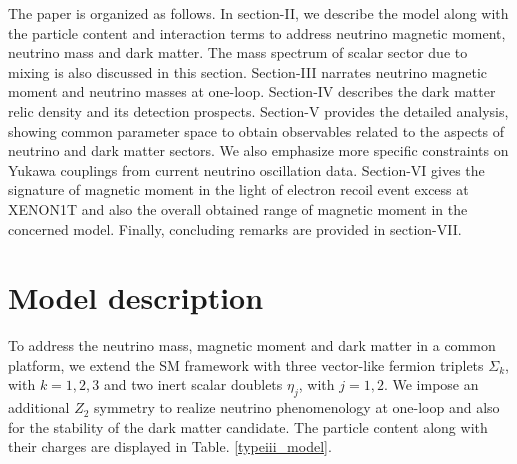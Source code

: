 \documentclass[aps, a4paper,superscriptaddress,12pt,preprintnumbers,floatfix,nofootinbib,amsmath,amssymb]{revtex4}
\begin{document}
The paper is organized as follows. In section-II, we describe the model along with the particle content and interaction terms to address neutrino magnetic moment, neutrino mass and dark matter. The mass spectrum of scalar sector due to mixing is also discussed in this section. Section-III  narrates neutrino magnetic moment and neutrino masses at one-loop. Section-IV describes the   dark matter relic density and its detection prospects. Section-V provides the detailed analysis, showing common parameter space to obtain observables related to the aspects of neutrino and dark matter sectors. We also emphasize more specific constraints on Yukawa couplings from current neutrino oscillation data. Section-VI gives the signature of magnetic moment in the light of electron recoil event excess at XENON1T and also the overall obtained range of magnetic moment in the concerned model. Finally, concluding remarks are provided in section-VII.

\section{Model description}
To address the neutrino mass,  magnetic moment and dark matter in a common platform, we extend the SM framework with three vector-like fermion triplets $\Sigma_k$, with $k=1,2,3$ and two inert scalar doublets $\eta_j$, with $j=1,2$. We impose an additional $Z_2$ symmetry to realize neutrino phenomenology at one-loop and also for the stability of the dark matter candidate. The particle content along with their charges are displayed in Table. \ref{typeiii_model}.
\end{document}
